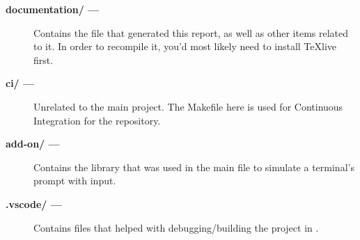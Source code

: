 \documentclass[12pt, a4paper]{report}
\begin{document}
            \begin{description}
                \item[\bf{documentation/} ---]
                    Contains the  file that generated this report,
                    as well as other items related to it. In order to recompile it,
                    you'd most likely need to install \TeX{}live first.
                \item[\bf{ci/} ---]
                    Unrelated to the main project. The Makefile here is used for 
                    Continuous Integration for the  repository.
                \item[\bf{add-on/} ---]
                    Contains the  library that was used in the 
                    main file to simulate a terminal's prompt with input.
                \item[\bf{.vscode/} ---]
                    Contains files that helped with debugging/building the project
                    in .
            \end{description}
\end{document}
